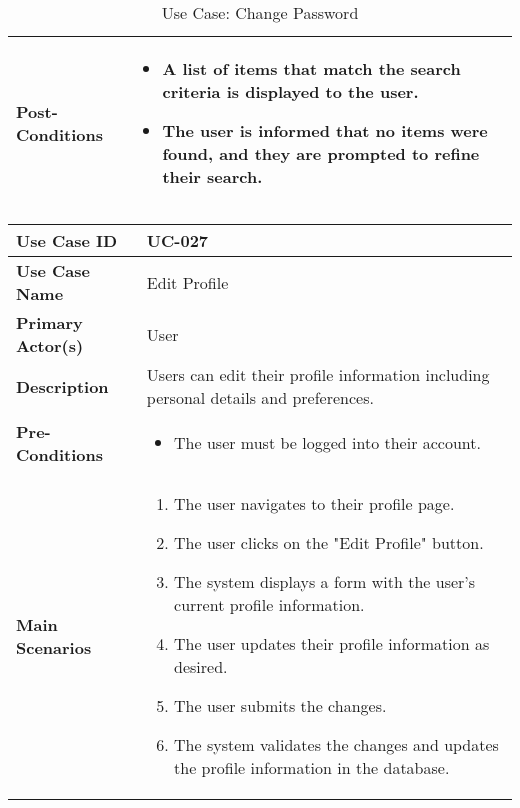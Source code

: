 \begin{table}[!ht]
\begin{tabularx}{\textwidth}{|l|X|}
        \hline
        \textbf{Post-Conditions} & 
        \begin{itemize}[label=--,itemsep=0pt]
            \item A list of items that match the search criteria is displayed to the user.
            \item The user is informed that no items were found, and they are prompted to refine their search.
        \end{itemize} \\
        \hline
    \end{tabularx}
    \caption{Use Case: Change Password}
    \label{tab:use-case-change-password}
\end{table}


\begin{table}[!ht]
    \centering
    \renewcommand{\arraystretch}{1.3} %
    \begin{tabularx}{\textwidth}{|l|X|}
        \hline
        \textbf{Use Case ID} & UC-027 \\
        \hline
        \textbf{Use Case Name} & Edit Profile \\
        \hline
        \textbf{Primary Actor(s)} & User \\
        \hline
        \textbf{Description} & Users can edit their profile information including personal details and preferences. \\
        \hline
        \textbf{Pre-Conditions} & 
        \begin{itemize}[label=--,itemsep=0pt]
            \item The user must be logged into their account.
        \end{itemize} \\
        \hline
        \textbf{Main Scenarios} & 
        \begin{enumerate}[label=\arabic*.,itemsep=0pt]
            \item The user navigates to their profile page.
            \item The user clicks on the "Edit Profile" button.
            \item The system displays a form with the user's current profile information.
            \item The user updates their profile information as desired.
            \item The user submits the changes.
            \item The system validates the changes and updates the profile information in the database.

\end{enumerate}
\end{tabularx}
\end{table}
